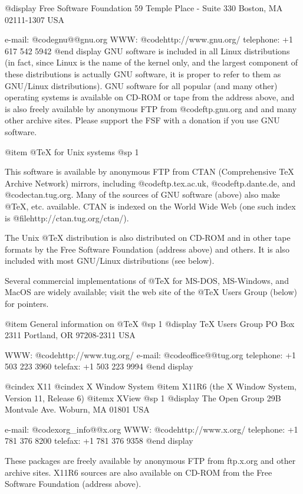 {{{{{{{{{@display
Free Software Foundation
59 Temple Place - Suite 330
Boston, MA 02111-1307 USA

e-mail: @code{gnu@@gnu.org}
WWW: @code{http://www.gnu.org/}
telephone: +1 617 542 5942
@end display
GNU software is included in all Linux distributions (in fact, since Linux
is the name of the kernel only, and the largest component of these
distributions is actually GNU software, it is proper to refer to them as
GNU/Linux distributions).  GNU software for all popular (and many other)
operating systems is available on CD-ROM or tape from the address above, and
is also freely available by anonymous FTP from @code{ftp.gnu.org} and and many
other archive sites.  Please support the FSF with a donation if you use GNU
software.

@item @TeX{} for Unix systems
@sp 1

This software is available by anonymous FTP from CTAN (Comprehensive TeX
Archive Network) mirrors, including @code{ftp.tex.ac.uk}, @code{ftp.dante.de},
and @code{ctan.tug.org}.  Many of the sources of GNU software (above) also make
@TeX{}, etc. available.  CTAN is indexed on the World Wide Web (one such index
is @file{http://ctan.tug.org/ctan/}).

The Unix @TeX{} distribution is also distributed on CD-ROM and in other tape
formats by the Free Software Foundation (address above) and others.  It is
also included with most GNU/Linux distributions (see below).

Several commercial implementations of @TeX{} for MS-DOS, MS-Windows, and MacOS
are widely available;  visit the web site of the @TeX{} Users Group (below) for
pointers.

@item General information on @TeX{}
@sp 1
@display
TeX Users Group
PO Box 2311
Portland, OR 97208-2311 USA

WWW: @code{http://www.tug.org/}
e-mail: @code{office@@tug.org}
telephone: +1 503 223 3960
telefax: +1 503 223 9994
@end display

@cindex X11
@cindex X Window System
@item X11R6 (the X Window System, Version 11, Release 6)
@itemx XView
@sp 1
@display
The Open Group
29B Montvale Ave.
Woburn, MA 01801 USA

e-mail: @code{xorg_info@@x.org}
WWW: @code{http://www.x.org/}
telephone: +1 781 376 8200
telefax: +1 781 376 9358
@end display

These packages are freely available by anonymous FTP from
ftp.x.org and other archive sites.  X11R6 sources are also available
on CD-ROM from the Free Software Foundation (address above).

}}}}}}}}}
